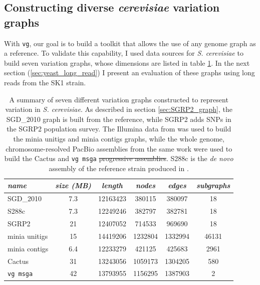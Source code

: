 \documentclass[a4paper,12pt,numbered,oneside]{Classes/PhDThesisPSnPDF}
\providecommand{\DIFaddtex}[1]{{\protect\color{blue}\uwave{#1}}} %
\providecommand{\DIFdeltex}[1]{{\protect\color{red}\sout{#1}}}                      %
\providecommand{\DIFaddFL}[1]{\DIFadd{#1}} %
\providecommand{\DIFdelFL}[1]{\DIFdel{#1}} %
\providecommand{\DIFaddbeginFL}{} %
\providecommand{\DIFaddendFL}{} %
\providecommand{\DIFdelbeginFL}{} %
\providecommand{\DIFdelendFL}{} %
\providecommand{\DIFadd}[1]{\texorpdfstring{\DIFaddtex{#1}}{#1}} %
\providecommand{\DIFdel}[1]{\texorpdfstring{\DIFdeltex{#1}}{}} %
\begin{document}
\subsection{Constructing diverse \emph{cerevisiae} variation graphs}
\label{sec:constructing_yeast_graphs}

With {\tt vg}, our goal is to build a toolkit that allows the use of any genome graph as a reference.
To validate this capability, I used data sources for \emph{S. cerevisiae} to build seven variation graphs, whose dimensions are listed in table \ref{table:yeast_graphs}.
In the next section (\ref{sec:yeast_long_read}) I present an evaluation of these graphs using long reads from the SK1 strain.


\begin{table}[h]
  \centering
\begin{tabular}{l||c|c|c|c|c}
\itshape name & \itshape size (MB) & \itshape length & \itshape nodes & \itshape edges & \itshape subgraphs \\
\hline
SGD\_2010 & 7.3 & 12163423 & 380115 & 380097 & 18 \\
S288c & 7.3 & 12249246 & 382797 & 382781 & 18 \\
SGRP2 & 21 & 12407052 & 714533 & 969690 & 18 \\
minia unitigs & 15 & 14419206 & 1232804 & 1332994 & 46131 \\
minia contigs & 6.4 & 12233279 & 421125 & 425683 & 2961 \\
Cactus & 31 & 13243056 & 1059173 & 1304205 & 580 \\
{\tt vg msga} & 42 & 13793955 & 1156295 & 1387903 & 2 \\
\hline
\end{tabular}
\caption[\emph{S. cerevisiae} variation graphs]{
  A summary of seven different variation graphs constructed to represent variation in \emph{S. cerevisiae}.
  As described in section \ref{sec:SGRP2_graph}, the SGD\_2010 graph is built from the reference, while SGRP2 adds SNPs in the SGRP2 population survey.
  The Illumina data from \cite{yue2017contrasting} was used to build the minia unitigs and minia contigs graphs, while the whole genome, chromosome-resolved PacBio assemblies from the same work were used to build the Cactus and {\tt vg msga} \DIFdelbeginFL \DIFdelFL{progressive assemblies}\DIFdelendFL \DIFaddbeginFL \DIFaddFL{variation graphs}\DIFaddendFL .
  S288c is the \emph{de novo} assembly of the reference strain produced in \cite{yue2017contrasting}.
}
\label{table:yeast_graphs}
\end{table}
\end{document}
